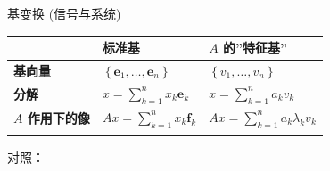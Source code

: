 \documentclass[
  ignorenonframetext,
]{beamer}
\newcounter{none} %
\begin{document}
\begin{frame}{基变换 (信号与系统)}
\protect{}\label{ux57faux53d8ux6362-ux4fe1ux53f7ux4e0eux7cfbux7edf-1}
{\def\LTcaptype{none} %
\begin{longtable}[]{@{}
  >{\centering\arraybackslash}p{}
  >{\centering\arraybackslash}p{}
  >{\centering\arraybackslash}p{}@{}}
\toprule\noalign{}
\begin{minipage}[b]{\linewidth}\centering
\end{minipage} & \begin{minipage}[b]{\linewidth}\centering
标准基
\end{minipage} & \begin{minipage}[b]{\linewidth}\centering
\(A\) 的''特征基''
\end{minipage} \\
\midrule\noalign{}
\endhead
\textbf{基向量} &
\(\left\{\mathbf{e}_{1}, \ldots, \mathbf{e}_{n}\right\}\) &
\(\left\{v_{1}, \ldots, v_{n}\right\}\) \\
\textbf{分解} & \(x=\sum_{k=1}^{n} x_{k} \mathbf{e}_{k}\) &
\(x=\sum_{k=1}^{n} a_{k} v_{k}\) \\
\textbf{\(A\) 作用下的像} & \(A x=\sum_{k=1}^{n} x_{k} \mathbf{f}_{k}\)
& \(A x=\sum_{k=1}^{n} a_{k} \lambda_{k} v_{k}\) \\
\bottomrule\noalign{}
\end{longtable}
}

对照：


\end{frame}
\end{document}
